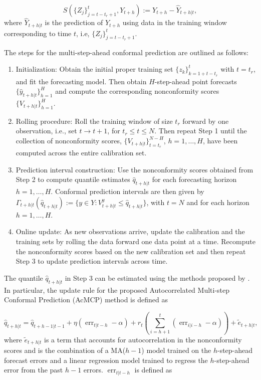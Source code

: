 \[
S(\{Z_j\}_{j=t-t_r + 1}^{t}, Y_{t+h}) := Y_{t+h} - \hat{Y}_{t+h\lvert t},
\] where \(\hat Y_{t+h\lvert t}\) is the prediction of \(Y_{t+h}\) using
data in the training window corresponding to time \(t\), i.e,
\(\{Z_j\}_{j=t-t_r + 1}^{t}\).

The steps for the multi-step-ahead conformal prediction are outlined as
follows:

\begin{enumerate}
\def\labelenumi{\arabic{enumi}.}
\tightlist
\item
  Initialization: Obtain the initial proper training set
  \(\{z_k\}_{k=1 + t - t_r}^{t}\) with \(t = t_r\), and fit the
  forecasting model. Then obtain \(H\)-step-ahead point forecasts
  \(\{\hat{y}_{t+h\lvert t}\}_{h=1}^H\) and compute the corresponding
  nonconformity scores \(\{V_{t+h\lvert t}\}_{h=1}^{H}\).
\item
  Rolling procedure: Roll the training window of size \(t_r\) forward by
  one observation, i.e., set \(t\to t+1\), for \(t_r\leq t\leq N\). Then
  repeat Step 1 until the collection of nonconformity scores,
  \(\{V_{t+h\lvert t}\}_{t=t_r}^{N-H}\), \(h=1,\ldots,H\), have been
  computed across the entire calibration set.
\item
  Prediction interval construction: Use the nonconformity scores
  obtained from Step 2 to compute quantile estimates
  \(\hat{q}_{t+h\lvert t}\) for each forecasting horizon \(h=1,\ldots,H\).
  Conformal prediction intervals are then given by
  \(\Gamma_{t+h\lvert t}(\hat{q}_{t+h\lvert t}):=\{y\in Y: V_{t+h\lvert t}^y \leq \hat{q}_{t+h\lvert t}\}\),
  with \(t=N\) and for each horizon \(h=1,\ldots, H\).
\item
  Online update: As new observations arrive, update the calibration
  and the training sets by rolling the data forward one data point at
  a time. Recompute the nonconformity scores based on the new
  calibration set and then repeat Step 3 to update prediction
  intervals across time.
\end{enumerate}

The quantile \(\hat{q}_{t+h\lvert t}\) in Step 3 can be estimated using
the methods proposed by \citet{Wang_Hyndman_2024}. In particular, the update
rule for the proposed Autocorrelated Multi-step Conformal Prediction
(AcMCP) method is defined as

\begin{equation}
\hat{q}_{t+h\lvert t}=\hat{q}_{t+h-1\lvert t-1}+\eta\left(\operatorname{err}_{t\lvert t-h}-\alpha\right)+r_t\left(\sum_{i=h+1}^t\left(\operatorname{err}_{i\lvert i-h}-\alpha\right)\right) + \tilde e_{t+h \lvert t},
\label{eq:updtrule-wang}
\end{equation} where \(\tilde e_{t+h\lvert t}\) is a term that accounts
for autocorrelation in the nonconformity scores and is the combination
of a MA(\(h-1\)) model trained on the \(h\)-step-ahead forecast errors and a
linear regression model trained to regress the \(h\)-step-ahead error from
the past \(h-1\) errors. \(\operatorname{err}_{t\lvert t-h}\) is defined as

